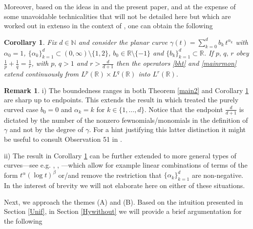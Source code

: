 \documentclass[a4paper,reqno]{amsart}
\numberwithin{equation}{section}
\newtheorem{corollary}[theorem]{Corollary}
\theoremstyle{definition}
\newtheorem{remark}[theorem]{Remark}
\newcommand{\R}{\mathbb{R}}
\newcommand{\N}{\mathbb{N}}
\def\a{\alpha}
\def\g{\gamma}
\def\b{\beta}
\begin{document}
Moreover, based on the ideas in \cite{Lie19} and the present paper, and at the expense of some unavoidable technicalities that will not be detailed here but which are worked out in extenso in the context of \cite{Lie19}, one can obtain the following

\begin{corollary}\label{extens} Fix $d\in\N$ and consider the planar curve $\g(t)=\sum_{k=0}^d b_k\,t^{\a_k}$ with $\a_0=1$, $\{\a_k\}_{k=1}^d\subset (0,\infty)\setminus\{1,2\}$,  $b_0\in \R\setminus\{-1\}$ and  $\{b_k\}_{k=1}^d\subset\R$. If $p,\,q,\,r$ obey $\frac{1}{p}+\frac{1}{q}=\frac{1}{r}$, with $p,\,q> 1$ and $r> \frac{d}{d+1}$ then the operators \eqref{bht} and \eqref{mainrmon} extend continuously from $L^p(\R)\times L^q(\R)$ into $L^r(\R)$.
\end{corollary}

\begin{remark} \label{main3}
i) The boundedness ranges in both Theorem \ref{main2} and Corollary \ref{extens} are sharp up to endpoints. This extends the result in \cite{LX16} which treated the purely curved case $b_0=0$ and $\a_k=k$ for $k\in\{1,\ldots, d\}$. Notice that the endpoint $\frac{d}{d+1}$ is dictated by the number of the nonzero fewnomials/monomials in the definition of $\g$ and not by the degree of $\g$. For a hint justifying this latter distinction it might be useful to consult Observation 51 in \cite{Lie19}.

ii) The result in  Corollary \ref{extens} can be further extended to more general types of curves---see e.g. \cite{Lie15}, \cite{GL20}, \cite{Lie19}---which allow for example linear combinations of terms of the form $t^{\a} (\log t)^{\b}$ or/and remove the restriction that $\{\a_k\}_{k=1}^d$ are non-negative. In the interest of brevity we will not elaborate here on either of these situations.
\end{remark}

Next, we approach the themes (A) and (B). Based on the intuition presented in Section \ref{Unif}, in Section \ref{Hywithout} we will provide a brief argumentation for the following
\end{document}
